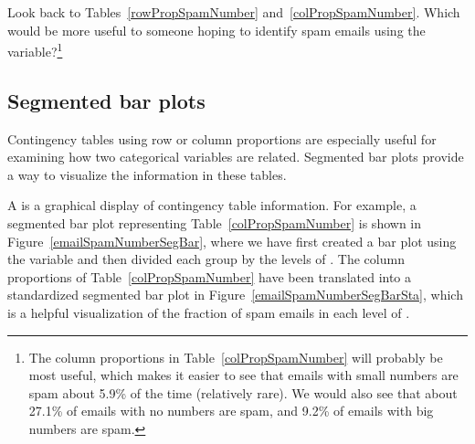 \begin{exercise}
Look back to Tables~\ref{rowPropSpamNumber} and~\ref{colPropSpamNumber}. Which would be more useful to someone hoping to identify spam emails using the  variable?\footnote{The column proportions in Table~\ref{colPropSpamNumber} will probably be most useful, which makes it easier to see that emails with small numbers are spam about 5.9\% of the time (relatively rare). We would also see that about 27.1\% of emails with no numbers are spam, and 9.2\% of emails with big numbers are spam.}
\end{exercise}


\subsection{Segmented bar plots}
\label{segmentedBarPlotsAndIndependence}

Contingency tables using row or column proportions are especially useful for examining how two categorical variables are related. Segmented bar plots provide a way to visualize the information in these tables.

A  is a graphical display of contingency table information. For example, a segmented bar plot representing Table~\ref{colPropSpamNumber} is shown in Figure~\ref{emailSpamNumberSegBar}, where we have first created a bar plot using the  variable and then divided each group by the levels of . The column proportions of Table~\ref{colPropSpamNumber} have been translated into a standardized segmented bar plot in Figure~\ref{emailSpamNumberSegBarSta}, which is a helpful visualization of the fraction of spam emails in each level of .

